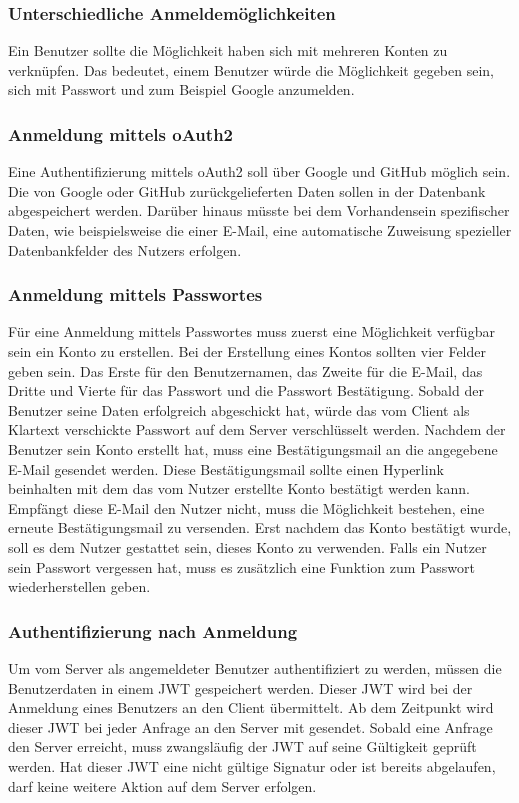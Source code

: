 \subsubsection{Unterschiedliche Anmeldemöglichkeiten}
Ein Benutzer sollte die Möglichkeit haben sich mit mehreren Konten zu verknüpfen. Das bedeutet, einem Benutzer würde die Möglichkeit gegeben sein, sich mit Passwort und zum Beispiel Google anzumelden. 

\subsubsection{Anmeldung mittels \gls{oAuth2}}
Eine Authentifizierung mittels oAuth2 soll über Google und GitHub möglich sein. Die von Google oder GitHub zurückgelieferten Daten sollen in der Datenbank abgespeichert werden. Darüber hinaus müsste bei dem Vorhandensein spezifischer Daten, wie beispielsweise die einer E-Mail, eine automatische Zuweisung spezieller Datenbankfelder des Nutzers erfolgen.

\subsubsection{Anmeldung mittels Passwortes}
Für eine Anmeldung mittels Passwortes muss zuerst eine Möglichkeit verfügbar sein ein Konto zu erstellen. Bei der Erstellung eines Kontos sollten vier Felder geben sein. Das Erste für den Benutzernamen, das Zweite für die E-Mail, das Dritte und Vierte für das Passwort und die Passwort Bestätigung. Sobald der Benutzer seine Daten erfolgreich abgeschickt hat, würde das vom Client als Klartext verschickte Passwort auf dem Server verschlüsselt werden. Nachdem der Benutzer sein Konto erstellt hat, muss eine Bestätigungsmail an die angegebene E-Mail gesendet werden. Diese Bestätigungsmail sollte einen Hyperlink beinhalten mit dem das vom Nutzer erstellte Konto bestätigt werden kann. Empfängt diese E-Mail den Nutzer nicht, muss die Möglichkeit bestehen, eine erneute Bestätigungsmail zu versenden. Erst nachdem das Konto bestätigt wurde, soll es dem Nutzer gestattet sein, dieses Konto zu verwenden. Falls ein Nutzer sein Passwort vergessen hat, muss es zusätzlich eine Funktion zum Passwort wiederherstellen geben.

\subsubsection{Authentifizierung nach Anmeldung}
Um vom Server als angemeldeter Benutzer authentifiziert zu werden, müssen die Benutzerdaten in einem \gls{JWT} gespeichert werden. Dieser \gls{JWT} wird bei der Anmeldung eines Benutzers an den Client übermittelt. Ab dem Zeitpunkt wird dieser \gls{JWT} bei jeder Anfrage an den Server mit gesendet. Sobald eine Anfrage den Server erreicht, muss zwangsläufig der \gls{JWT} auf seine Gültigkeit geprüft werden. Hat dieser \gls{JWT} eine nicht gültige Signatur oder ist bereits abgelaufen, darf keine weitere Aktion auf dem Server erfolgen.


